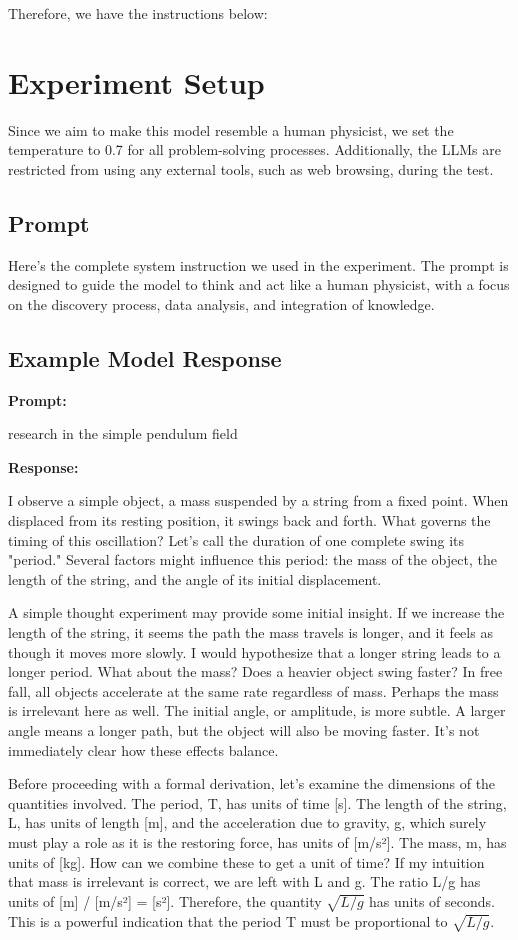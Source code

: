 \documentclass[12pt]{article}
\begin{document}
Therefore, we have the instructions below:


\section{Experiment Setup}
Since we aim to make this model resemble a human physicist, we set the temperature to 0.7 for all problem-solving processes. Additionally, the LLMs are restricted from using any external tools, such as web browsing, during the test.
\subsection{Prompt}
Here's the complete system instruction we used in the experiment. The prompt is designed to guide the model to think and act like a human physicist, with a focus on the discovery process, data analysis, and integration of knowledge.


\subsection{Example Model Response}

\textbf{Prompt:}

research in the simple pendulum field
\par
\bigskip
\textbf{Response:}

I observe a simple object, a mass suspended by a string from a fixed point. When displaced from its resting position, it swings back and forth. What governs the timing of this oscillation? Let's call the duration of one complete swing its "period." Several factors might influence this period: the mass of the object, the length of the string, and the angle of its initial displacement.

A simple thought experiment may provide some initial insight. If we increase the length of the string, it seems the path the mass travels is longer, and it feels as though it moves more slowly. I would hypothesize that a longer string leads to a longer period. What about the mass? Does a heavier object swing faster? In free fall, all objects accelerate at the same rate regardless of mass. Perhaps the mass is irrelevant here as well. The initial angle, or amplitude, is more subtle. A larger angle means a longer path, but the object will also be moving faster. It's not immediately clear how these effects balance.

Before proceeding with a formal derivation, let's examine the dimensions of the quantities involved. The period, T, has units of time [s]. The length of the string, L, has units of length [m], and the acceleration due to gravity, g, which surely must play a role as it is the restoring force, has units of [m/s²]. The mass, m, has units of [kg]. How can we combine these to get a unit of time? If my intuition that mass is irrelevant is correct, we are left with L and g. The ratio L/g has units of [m] / [m/s²] = [s²]. Therefore, the quantity \(\sqrt{L/g}\) has units of seconds. This is a powerful indication that the period T must be proportional to \(\sqrt{L/g}\).
\end{document}
